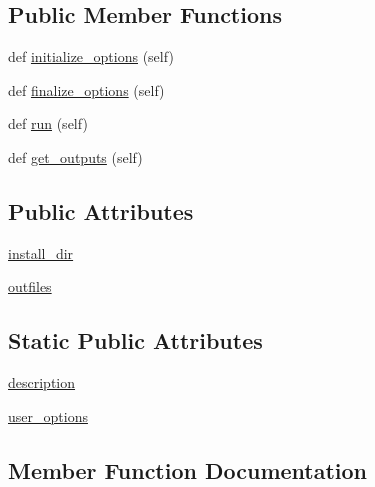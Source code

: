 \subsection*{Public Member Functions}
\begin{DoxyCompactItemize}
\item 
def \hyperlink{classnumpy_1_1distutils_1_1command_1_1install__clib_1_1install__clib_a0ff9a7f18c672e685b9241c18517e4c2}{initialize\+\_\+options} (self)
\item 
def \hyperlink{classnumpy_1_1distutils_1_1command_1_1install__clib_1_1install__clib_a5a28ae3e6d65053ae9f6c78ed3a8046d}{finalize\+\_\+options} (self)
\item 
def \hyperlink{classnumpy_1_1distutils_1_1command_1_1install__clib_1_1install__clib_a396cbd4d9946433cc8fd5900691c3208}{run} (self)
\item 
def \hyperlink{classnumpy_1_1distutils_1_1command_1_1install__clib_1_1install__clib_a2839dd3a47131f49e3d668958e302442}{get\+\_\+outputs} (self)
\end{DoxyCompactItemize}
\subsection*{Public Attributes}
\begin{DoxyCompactItemize}
\item 
\hyperlink{classnumpy_1_1distutils_1_1command_1_1install__clib_1_1install__clib_a341714c60696ea0dee2b68967ab40d72}{install\+\_\+dir}
\item 
\hyperlink{classnumpy_1_1distutils_1_1command_1_1install__clib_1_1install__clib_a22760349d1e9078843381764632fccc8}{outfiles}
\end{DoxyCompactItemize}
\subsection*{Static Public Attributes}
\begin{DoxyCompactItemize}
\item 
\hyperlink{classnumpy_1_1distutils_1_1command_1_1install__clib_1_1install__clib_a3f4c1959aa028cf70a142a901c50b084}{description}
\item 
\hyperlink{classnumpy_1_1distutils_1_1command_1_1install__clib_1_1install__clib_a3cff2e60d88bd1ed3b38d801b34b0ca0}{user\+\_\+options}
\end{DoxyCompactItemize}


\subsection{Member Function Documentation}
\mbox{\label{classnumpy_1_1distutils_1_1command_1_1install__clib_1_1install__clib_a5a28ae3e6d65053ae9f6c78ed3a8046d}} 
